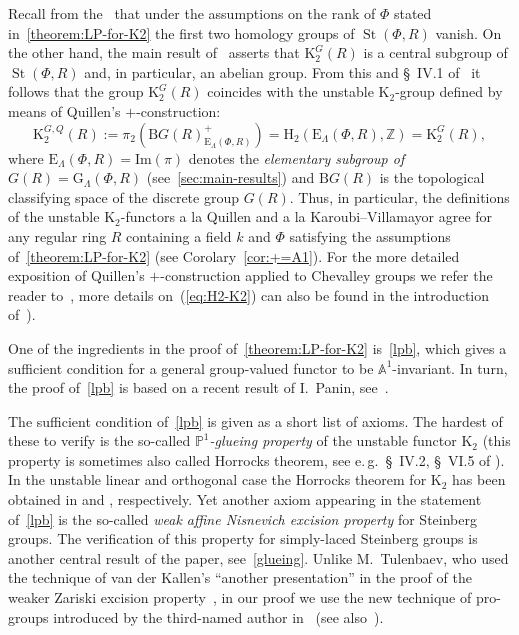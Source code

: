 \documentclass[oneside, 11pt]{amsart}
\numberwithin{equation}{section}
\newcommand{\K}{{\mathrm{K}}}
\newcommand{\St}{\mathop{\mathrm{St}}\nolimits}
\newcommand{\E}{\mathrm{E}}
\theoremstyle{definition}
\theoremstyle{definition}
\theoremstyle{remark}
\newcommand{\ZZ}{\mathbb{Z}}
\begin{document}
Recall from the~\cite[Theorem~5.3]{St71} that under the assumptions on the rank of $\Phi$ stated in~\cref{theorem:LP-for-K2} the first two homology groups of $\St(\Phi, R)$ vanish. On the other hand, the main result of~\cite{LSV20} asserts that $\K_2^G(R)$ is a central subgroup of $\St(\Phi, R)$ and, in particular, an abelian group.
From this and \S~IV.1 of~\cite{Kbook} it follows that the group $\K_2^G(R)$ coincides with the unstable $\K_2$-group defined by means of Quillen's $+$-construction:
\begin{equation} \label{eq:H2-K2}
  \K_{2}^{G,Q}(R) := \pi_2\left(\mathrm BG(R)^+_{\E_\Lambda(\Phi, R)}\right) = \mathrm{H}_2(\mathrm{E}_\Lambda(\Phi, R), \ZZ) = \K_2^G(R),
\end{equation}
where $\E_\Lambda(\Phi, R) = \mathrm{Im}(\pi)$ denotes the {\it elementary subgroup of $G(R) = \mathrm{G}_\Lambda(\Phi, R)$}  (see~\cref{sec:main-results}) and $\mathrm BG(R)$ is the topological classifying space of the discrete group $G(R)$. Thus, in particular, the definitions of the unstable $\K_2$-functors a la Quillen and a la Karoubi--Villamayor agree for any regular ring $R$ containing a field $k$ and $\Phi$ satisfying the assumptions of~\cref{theorem:LP-for-K2} (see Corolary~\ref{cor:+=A1}). For the more detailed exposition of Quillen's $+$-construction applied to Chevalley groups we refer the reader to~\cite[Subsection~2.3]{LS20}, more details on~(\ref{eq:H2-K2}) can also be found in the introduction of~\cite{LSV20}).

One of the ingredients in the proof of~\cref{theorem:LP-for-K2} is~\cref{lpb}, which gives a sufficient condition for a general group-valued functor to be $\mathbb{A}^1$-invariant. In turn, the proof of~\cref{lpb} is based on a recent result of I.~Panin, see~\cite[Theorem~2.5]{Pa19}. 

The sufficient condition of~\cref{lpb} is given as a short list of axioms. The hardest of these to verify is the so-called {\it $\mathbb{P}^1$-glueing property} of the unstable functor $\K_2$ (this property is sometimes also called Horrocks theorem, see e.\,g.~\S~IV.2, \S~VI.5 of \cite{Lam10}). In the unstable linear and orthogonal case the Horrocks theorem for $\K_2$ has been obtained in \cite{Tu83} and \cite{LS20}, respectively. Yet another axiom appearing in the statement of~\cref{lpb} is the so-called {\it weak affine Nisnevich excision property} for Steinberg groups. The verification of this property for simply-laced Steinberg groups is another central result of the paper, see~\cref{glueing}. Unlike M.~Tulenbaev, who used the technique of van der Kallen's ``another presentation'' in the proof of the weaker Zariski excision property~\cite[Proposition~1.4]{Tu83}, in our proof we use the new technique of pro-groups introduced by the third-named author in~\cite{Vor1} (see also~\cite{LSV20}). 
\end{document}
